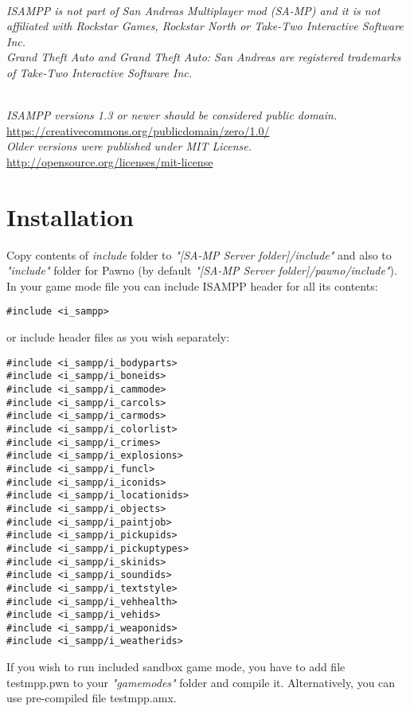 \documentclass{article}
\begin{document}
\textit{\\ISAMPP is not part of San Andreas Multiplayer mod (SA-MP) and it is not affiliated with Rockstar Games, Rockstar North or Take-Two Interactive Software Inc.}
\textit{\\Grand Theft Auto and Grand Theft Auto: San Andreas are registered trademarks of Take-Two Interactive Software Inc.}

\textit{\\ISAMPP versions 1.3 or newer should be considered public domain.}
\\\url{https://creativecommons.org/publicdomain/zero/1.0/}
\bigskip
\\\textit{Older versions were published under MIT License.}
\\\url{http://opensource.org/licenses/mit-license}

\section{Installation}
Copy contents of \textit{include} folder to \textit{"[SA-MP Server folder]/include"} and also to \textit{"include"} folder for Pawno (by default \textit{"[SA-MP Server folder]/pawno/include"}).
\\In your game mode file you can include ISAMPP header for all its contents:
\begin{verbatim}
#include <i_sampp>
\end{verbatim}
or include header files as you wish separately:
\begin{verbatim}
#include <i_sampp/i_bodyparts>
#include <i_sampp/i_boneids>
#include <i_sampp/i_cammode>
#include <i_sampp/i_carcols>
#include <i_sampp/i_carmods>
#include <i_sampp/i_colorlist>
#include <i_sampp/i_crimes>
#include <i_sampp/i_explosions>
#include <i_sampp/i_funcl>
#include <i_sampp/i_iconids>
#include <i_sampp/i_locationids>
#include <i_sampp/i_objects>
#include <i_sampp/i_paintjob>
#include <i_sampp/i_pickupids>
#include <i_sampp/i_pickuptypes>
#include <i_sampp/i_skinids>
#include <i_sampp/i_soundids>
#include <i_sampp/i_textstyle>
#include <i_sampp/i_vehhealth>
#include <i_sampp/i_vehids>
#include <i_sampp/i_weaponids>
#include <i_sampp/i_weatherids>
\end{verbatim}
If you wish to run included sandbox game mode, you have to add file testmpp.pwn to your \textit{"gamemodes"} folder and compile it. Alternatively, you can use pre-compiled file testmpp.amx.

\newpage
\end{document}
